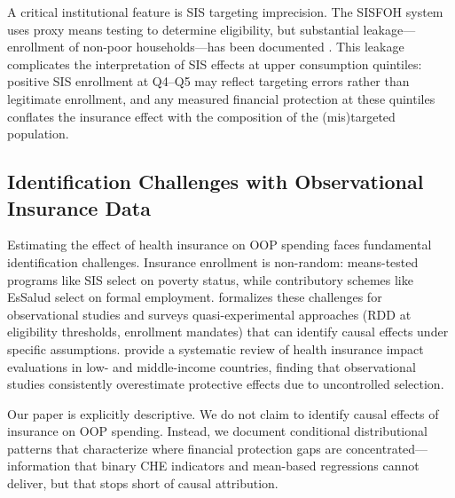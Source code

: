 A critical institutional feature is SIS targeting imprecision. The SISFOH system uses proxy means testing to determine eligibility, but substantial leakage---enrollment of non-poor households---has been documented \citep{Cortez2008, Francke2013}. This leakage complicates the interpretation of SIS effects at upper consumption quintiles: positive SIS enrollment at Q4--Q5 may reflect targeting errors rather than legitimate enrollment, and any measured financial protection at these quintiles conflates the insurance effect with the composition of the (mis)targeted population.

\subsection{Identification Challenges with Observational Insurance Data}

Estimating the effect of health insurance on OOP spending faces fundamental identification challenges. Insurance enrollment is non-random: means-tested programs like SIS select on poverty status, while contributory schemes like EsSalud select on formal employment. \citet{Wagstaff2010} formalizes these challenges for observational studies and surveys quasi-experimental approaches (RDD at eligibility thresholds, enrollment mandates) that can identify causal effects under specific assumptions. \citet{Acharya2012} provide a systematic review of health insurance impact evaluations in low- and middle-income countries, finding that observational studies consistently overestimate protective effects due to uncontrolled selection.

Our paper is explicitly descriptive. We do not claim to identify causal effects of insurance on OOP spending. Instead, we document conditional distributional patterns that characterize where financial protection gaps are concentrated---information that binary CHE indicators and mean-based regressions cannot deliver, but that stops short of causal attribution.

